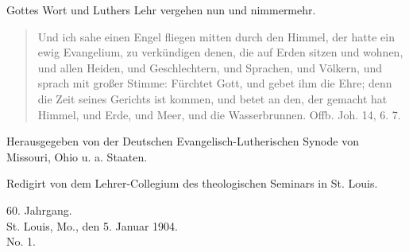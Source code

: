 \begin{titelseite}

Gottes Wort und Luthers Lehr vergehen nun und nimmermehr.\\[1em]

\begin{quote}
Und ich sahe einen Engel fliegen mitten durch den Himmel, der hatte ein ewig Evangelium, zu verkündigen denen, die auf Erden sitzen und wohnen, und allen Heiden, und Geschlechtern, und Sprachen, und Völkern, und sprach mit großer Stimme: Fürchtet Gott, und gebet ihm die Ehre; denn die Zeit seines Gerichts ist kommen, und betet an den, der gemacht hat Himmel, und Erde, und Meer, und die Wasserbrunnen. Offb. Joh. 14, 6. 7.
\end{quote}


Herausgegeben von der Deutschen Evangelisch-Lutherischen Synode von Missouri, Ohio u. a. Staaten.

Redigirt von dem Lehrer-Collegium des theologischen Seminars in St. Louis.

60. Jahrgang.\\
St. Louis, Mo., den 5. Januar 1904.\\
No. 1.
\end{titelseite}
